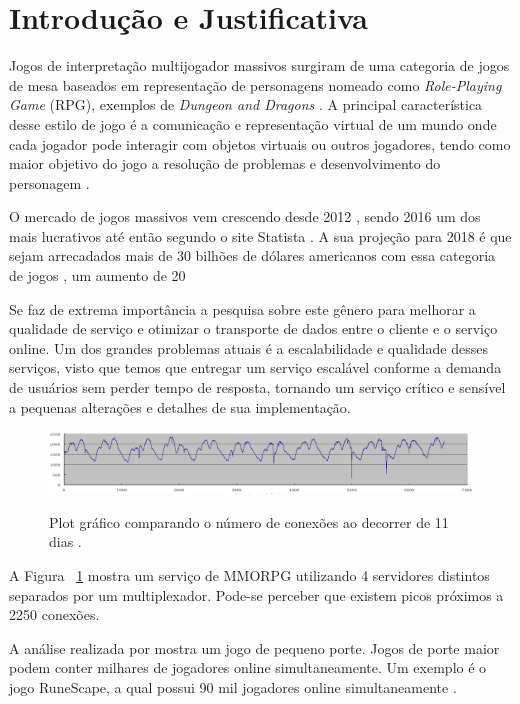 \section{Introdução e Justificativa}
\label{sec:int}

Jogos de interpretação multijogador massivos surgiram de uma categoria de jogos de mesa baseados em representação de personagens nomeado como \textit{Role-Playing Game} (RPG), exemplos de \textit{Dungeon and Dragons} \cite{tsr1980dungeons}. A principal característica desse estilo de jogo é a comunicação e representação virtual de um mundo onde cada jogador pode interagir com objetos virtuais ou outros jogadores, tendo como maior objetivo do jogo a resolução de problemas e desenvolvimento do personagem \cite{video_game_technologies}.

O mercado de jogos massivos vem crescendo desde 2012 \cite{new_york_times}, sendo 2016 um dos mais lucrativos até então segundo o site Statista \cite{statista_2016}. A sua projeção para 2018 é que sejam arrecadados mais de 30 bilhões de dólares americanos com essa categoria de jogos \cite{statista_2018}, um aumento de 20%

Se faz de extrema importância a pesquisa sobre este gênero para melhorar a qualidade de serviço e otimizar o transporte de dados entre o cliente e o serviço online. Um dos grandes problemas atuais é a escalabilidade e qualidade desses serviços, visto que temos que entregar um serviço escalável conforme a demanda de usuários sem perder tempo de resposta, tornando um serviço crítico e sensível a pequenas alterações e detalhes de sua implementação.

\begin{figure}[h]
\caption{Plot gráfico comparando o número de conexões ao decorrer de 11 dias
\cite{system_performance}.}
\centering
\includegraphics[width=1\textwidth]{img/connection_peer_hour.png}
\label{fig:conection_peer_hour}
\end{figure}

A Figura ~\ref{fig:conection_peer_hour} mostra um serviço de MMORPG utilizando 4 servidores distintos separados por um multiplexador. Pode-se perceber que existem picos próximos a 2250 conexões.

A análise realizada por \cite{system_performance} mostra um jogo de pequeno porte. Jogos de porte maior podem conter milhares de jogadores online simultaneamente. Um exemplo é o jogo RuneScape, a qual possui 90 mil jogadores online simultaneamente \cite{runescape_online_users}.
